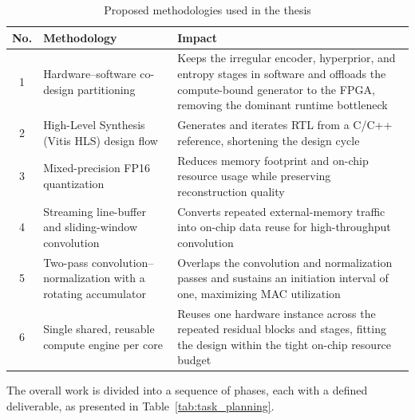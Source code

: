 \begin{table}[H]
\centering
\caption{Proposed methodologies used in the thesis}
\label{tab:methodologies}
\renewcommand{\arraystretch}{1.3}
\begin{tabularx}{\textwidth}{|c|>{\raggedright\arraybackslash}p{}|X|}
\hline
\textbf{No.} & \textbf{Methodology} & \textbf{Impact} \\
\hline
1 & Hardware--software co-design partitioning & Keeps the irregular encoder, hyperprior, and entropy stages in software and offloads the compute-bound generator to the FPGA, removing the dominant runtime bottleneck \\
\hline
2 & High-Level Synthesis (Vitis HLS) design flow & Generates and iterates RTL from a C/C++ reference, shortening the design cycle \\
\hline
3 & Mixed-precision FP16 quantization & Reduces memory footprint and on-chip resource usage while preserving reconstruction quality \\
\hline
4 & Streaming line-buffer and sliding-window convolution & Converts repeated external-memory traffic into on-chip data reuse for high-throughput convolution \\
\hline
5 & Two-pass convolution--normalization with a rotating accumulator & Overlaps the convolution and normalization passes and sustains an initiation interval of one, maximizing MAC utilization \\
\hline
6 & Single shared, reusable compute engine per core & Reuses one hardware instance across the repeated residual blocks and stages, fitting the design within the tight on-chip resource budget \\
\hline
\end{tabularx}
\end{table}

The overall work is divided into a sequence of phases, each with a defined deliverable, as presented in Table~\ref{tab:task_planning}.

